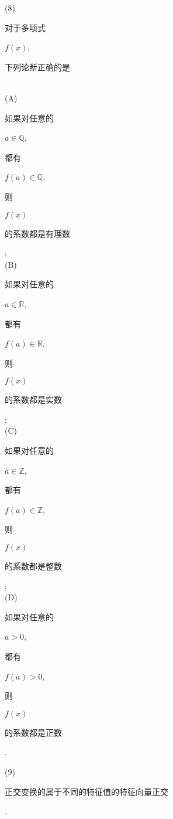 \documentclass[10pt]{article}
\begin{document}
(8) \begin{CJK}{UTF8}{mj}对于多项式\end{CJK} $f(x)$, \begin{CJK}{UTF8}{mj}下列论断正确的是\end{CJK}\\
(A) \begin{CJK}{UTF8}{mj}如果对任意的\end{CJK} $a \in \mathbb{Q}$, \begin{CJK}{UTF8}{mj}都有\end{CJK} $f(a) \in \mathbb{Q}$, \begin{CJK}{UTF8}{mj}则\end{CJK} $f(x)$ \begin{CJK}{UTF8}{mj}的系数都是有理数\end{CJK};\\
(B) \begin{CJK}{UTF8}{mj}如果对任意的\end{CJK} $a \in \mathbb{R}$, \begin{CJK}{UTF8}{mj}都有\end{CJK} $f(a) \in \mathbb{R}$, \begin{CJK}{UTF8}{mj}则\end{CJK} $f(x)$ \begin{CJK}{UTF8}{mj}的系数都是实数\end{CJK};\\
(C) \begin{CJK}{UTF8}{mj}如果对任意的\end{CJK} $a \in \mathbb{Z}$, \begin{CJK}{UTF8}{mj}都有\end{CJK} $f(a) \in \mathbb{Z}$, \begin{CJK}{UTF8}{mj}则\end{CJK} $f(x)$ \begin{CJK}{UTF8}{mj}的系数都是整数\end{CJK};\\
(D) \begin{CJK}{UTF8}{mj}如果对任意的\end{CJK} $a>0$, \begin{CJK}{UTF8}{mj}都有\end{CJK} $f(a)>0$, \begin{CJK}{UTF8}{mj}则\end{CJK} $f(x)$ \begin{CJK}{UTF8}{mj}的系数都是正数\end{CJK}.

(9) \begin{CJK}{UTF8}{mj}正交变换的属于不同的特征值的特征向量正交\end{CJK}.
\end{document}
